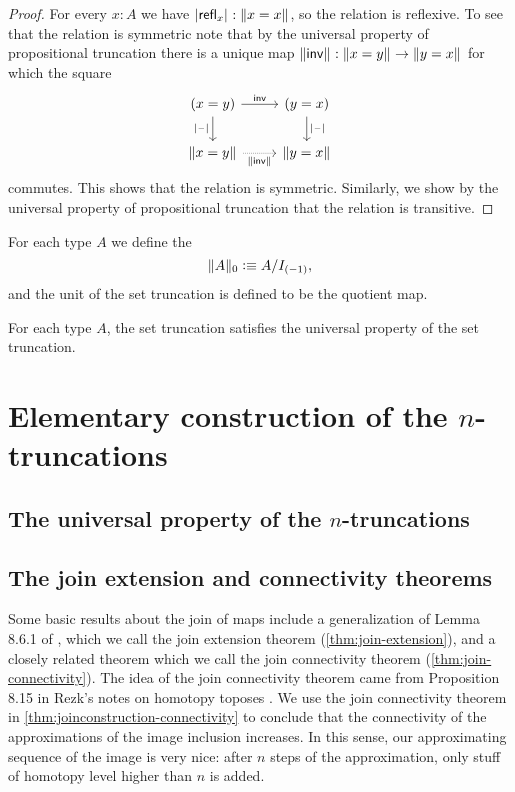 \begin{proof}
For every $x:A$ we have $\bproj{\refl{x}}:\brck{x=x}$, so the relation is reflexive. To see that the relation is symmetric note that by the universal property of propositional truncation there is a unique map $\brck{\invfunc}:\brck{x=y}\to\brck{y=x}$ for which the square
\begin{equation*}
\begin{tikzcd}
(x=y) \arrow[r,"\invfunc"] \arrow[d,swap,"\bproj{\blank}"] & (y=x) \arrow[d,"\bproj{\blank}"] \\
\brck{x=y} \arrow[r,densely dotted,swap,"\brck{\invfunc}"] & \brck{y=x}
\end{tikzcd}
\end{equation*}
commutes. This shows that the relation is symmetric. Similarly, we show by the universal property of propositional truncation that the relation is transitive.
\end{proof}

\begin{defn}
For each type $A$ we define the 
\begin{equation*}
\trunc{0}{A}\defeq A/I_{(-1)},
\end{equation*}
and the unit of the set truncation is defined to be the quotient map.
\end{defn}

\begin{thm}
For each type $A$, the set truncation satisfies the universal property of the set truncation.
\end{thm}

\section{Elementary construction of the $n$-truncations}

\subsection{The universal property of the $n$-truncations}

\subsection{The join extension and connectivity theorems}

Some basic results about the join of maps include a generalization of Lemma 8.6.1 of
\cite{hottbook}, which we call the join extension theorem (\autoref{thm:join-extension}), and a closely
related theorem which we call the join connectivity theorem (\autoref{thm:join-connectivity}).
The idea of the join connectivity theorem came from Proposition 8.15 in 
Rezk's notes on homotopy toposes \cite{Rezk}.
We use the join connectivity theorem in 
\autoref{thm:joinconstruction-connectivity} to conclude that the connectivity 
of the approximations of the image inclusion increases.
In this sense, our approximating sequence of the image is very nice:
after $n$ steps of the approximation, only stuff of homotopy level higher than
$n$ is added.

